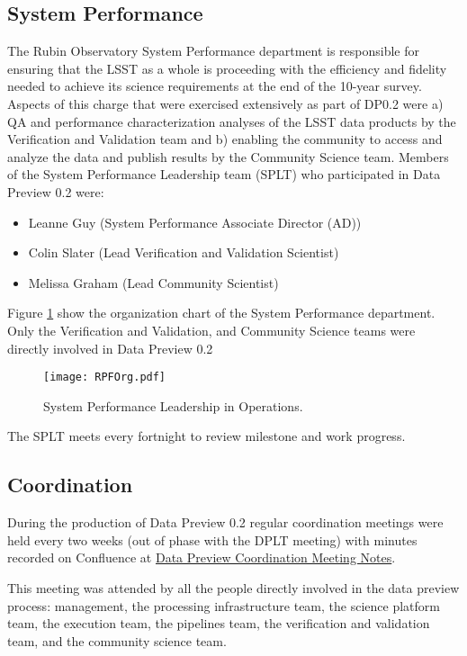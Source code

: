 \subsection{System Performance}
The Rubin Observatory System Performance department is responsible for ensuring that the LSST as a whole is proceeding with the efficiency and fidelity needed to achieve its science requirements at the end of the 10-year survey. 
Aspects of this charge that were exercised extensively as part of DP0.2 were a) QA and performance characterization analyses of the LSST data products by the Verification and Validation team and b) enabling the community to access and analyze the data and publish results by the Community Science team.
Members of the System Performance Leadership team (SPLT) who participated in Data Preview 0.2 were:
\begin{itemize}
\item Leanne Guy (System Performance Associate Director (AD))
\item Colin Slater (Lead Verification and Validation Scientist)
\item Melissa Graham (Lead Community Scientist)
\end{itemize}

Figure \ref{fig:RPFOrg} show the organization chart of the System Performance department. 
Only the Verification and Validation, and Community Science teams were directly involved in Data Preview 0.2
\begin{figure}
\texttt{[image: RPFOrg.pdf]}
\caption{System Performance Leadership in Operations.  \label{fig:RPFOrg}}
\end{figure}
The SPLT meets every fortnight to review milestone and work progress. 

\subsection{Coordination}

During the production of Data Preview 0.2 regular coordination meetings were held every two weeks (out of phase with the DPLT meeting) with minutes recorded on Confluence at \href{https://confluence.lsstcorp.org/display/LSSTOps/Data+Preview+Coordination+Meeting+Notes}{Data Preview Coordination Meeting Notes}.

This meeting was attended by all the people directly involved in the data preview process: management, the processing infrastructure team, the science platform team, the execution team, the pipelines team, the verification and validation team, and the community science team.

